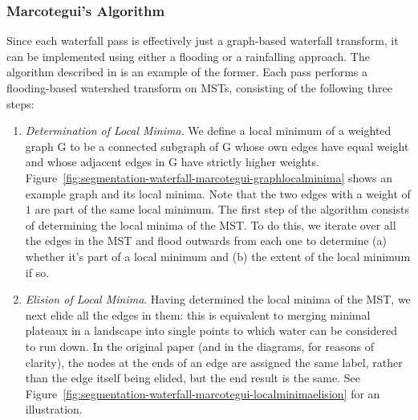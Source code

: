 \subsubsection{Marcotegui's Algorithm}

Since each waterfall pass is effectively just a graph-based waterfall transform, it can be implemented using either a flooding or a rainfalling approach. The algorithm described in \cite{marcotegui05} is an example of the former. Each pass performs a flooding-based watershed transform on MSTs, consisting of the following three steps:

\begin{enumerate}

\item \emph{Determination of Local Minima}. We define a local minimum of a weighted graph G to be a connected subgraph of G whose own edges have equal weight and whose adjacent edges in G have strictly higher weights. Figure~\ref{fig:segmentation-waterfall-marcotegui-graphlocalminima} shows an example graph and its local minima. Note that the two edges with a weight of $1$ are part of the same local minimum. The first step of the algorithm consists of determining the local minima of the MST. To do this, we iterate over all the edges in the MST and flood outwards from each one to determine (a) whether it's part of a local minimum and (b) the extent of the local minimum if so.


\item \emph{Elision of Local Minima}. Having determined the local minima of the MST, we next elide all the edges in them: this is equivalent to merging minimal plateaux in a landscape into single points to which water can be considered to run down. In the original paper (and in the diagrams, for reasons of clarity), the nodes at the ends of an edge are assigned the same label, rather than the edge itself being elided, but the end result is the same. See Figure~\ref{fig:segmentation-waterfall-marcotegui-localminimaelision} for an illustration.



\end{enumerate}

